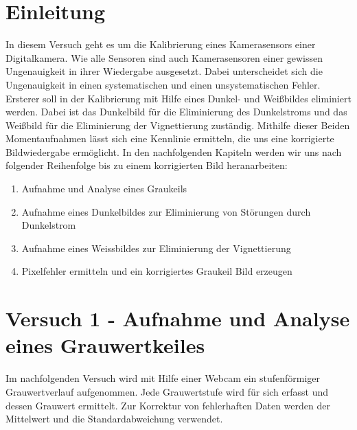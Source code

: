\documentclass[12pt,oneside,a4paper]{report}
\begin{document}




\clearpage

%
%


%
%


%
%


%
%




\setcounter{page}{1}
%
%
\chapter{Einleitung}
\label{chap:EINL}
In diesem Versuch geht es um die Kalibrierung eines Kamerasensors einer Digitalkamera. Wie alle Sensoren sind auch Kamerasensoren einer gewissen Ungenauigkeit in ihrer Wiedergabe ausgesetzt. Dabei unterscheidet sich die Ungenauigkeit in einen systematischen und einen unsystematischen Fehler. Ersterer soll in der Kalibrierung mit Hilfe eines Dunkel- und Weißbildes eliminiert werden. Dabei ist das Dunkelbild für die Eliminierung des Dunkelstroms und das Weißbild für die Eliminierung der Vignettierung zuständig. Mithilfe dieser Beiden Momentaufnahmen lässt sich eine Kennlinie ermitteln, die uns eine korrigierte Bildwiedergabe ermöglicht. 
In den nachfolgenden Kapiteln werden wir uns nach folgender Reihenfolge bis zu einem korrigierten Bild heranarbeiten:

\begin{enumerate}
	\item Aufnahme und Analyse eines Graukeils
	\item Aufnahme eines Dunkelbildes zur Eliminierung von Störungen 	durch Dunkelstrom
	\item Aufnahme eines Weissbildes zur Eliminierung der Vignettierung
	\item Pixelfehler ermitteln und ein korrigiertes Graukeil Bild erzeugen
\end{enumerate}


%
%
\chapter{Versuch 1 - Aufnahme und Analyse eines Grauwertkeiles}
\label{chap:VERSUCH_1}
Im nachfolgenden Versuch wird mit Hilfe einer Webcam ein stufenförmiger Grauwertverlauf aufgenommen. Jede Grauwertstufe wird für sich erfasst und  dessen Grauwert ermittelt. Zur Korrektur von fehlerhaften Daten werden der Mittelwert und die Standardabweichung verwendet. 
\end{document}
